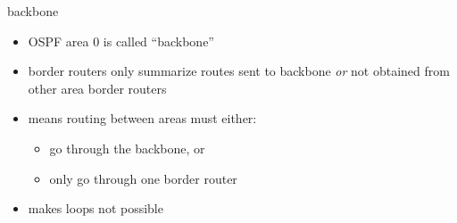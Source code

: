 \usetikzlibrary{shapes,shapes.misc,arrows.meta}
\begin{frame}{backbone}
    \begin{itemize}
    \item OSPF area 0 is called ``backbone''
    \item border routers only summarize routes sent to backbone \textit{or}
        not obtained from other area border routers
    \vspace{.5cm}
    \item means routing between areas must either:
        \begin{itemize}
        \item go through the backbone, or
        \item only go through one border router
        \end{itemize}
    \item makes loops not possible
    \end{itemize}
\end{frame}

